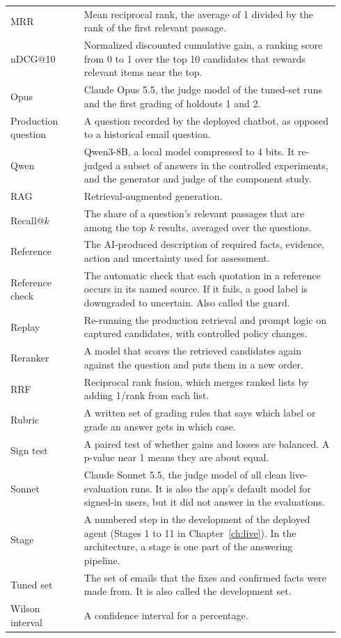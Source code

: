\begin{longtable}{@{}>{\raggedright\arraybackslash}p{0.21\linewidth}>{\raggedright\arraybackslash}p{0.73\linewidth}@{}}
MRR & Mean reciprocal rank, the average of 1 divided by the rank of the first relevant passage. \\
nDCG@10 & Normalized discounted cumulative gain, a ranking score from 0 to 1 over the top 10 candidates that rewards relevant items near the top. \\
Opus & Claude Opus 5.5, the judge model of the tuned-set runs and the first grading of holdouts 1 and 2. \\
Production question & A question recorded by the deployed chatbot, as opposed to a historical email question. \\
Qwen & Qwen3-8B, a local model compressed to 4 bits. It re-judged a subset of answers in the controlled experiments, and the generator and judge of the component study. \\
RAG & Retrieval-augmented generation. \\
Recall@$k$ & The share of a question's relevant passages that are among the top $k$ results, averaged over the questions. \\
Reference & The AI-produced description of required facts, evidence, action and uncertainty used for assessment. \\
Reference check & The automatic check that each quotation in a reference occurs in its named source. If it fails, a good label is downgraded to uncertain. Also called the guard. \\
Replay & Re-running the production retrieval and prompt logic on captured candidates, with controlled policy changes. \\
Reranker & A model that scores the retrieved candidates again against the question and puts them in a new order. \\
RRF & Reciprocal rank fusion, which merges ranked lists by adding 1/rank from each list. \\
Rubric & A written set of grading rules that says which label or grade an answer gets in which case. \\
Sign test & A paired test of whether gains and losses are balanced. A p-value near 1 means they are about equal. \\
Sonnet & Claude Sonnet 5.5, the judge model of all clean live-evaluation runs. It is also the app's default model for signed-in users, but it did not answer in the evaluations. \\
Stage & A numbered step in the development of the deployed agent (Stages 1 to 11 in Chapter~\ref{ch:live}). In the architecture, a stage is one part of the answering pipeline. \\
Tuned set & The set of emails that the fixes and confirmed facts were made from. It is also called the development set. \\
Wilson interval & A confidence interval for a percentage. \\
\bottomrule
\end{longtable}
\addtocounter{table}{-1}
